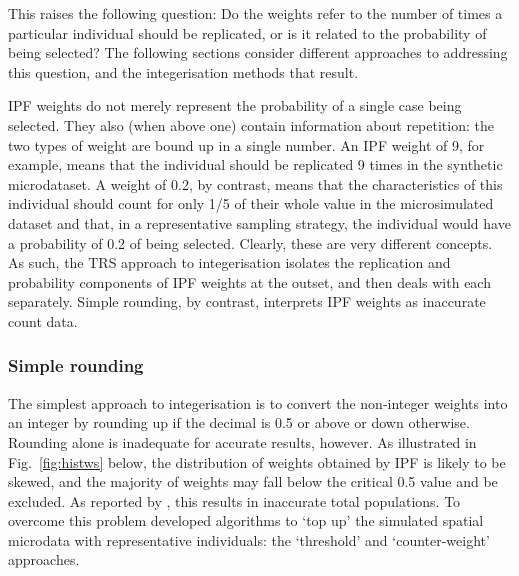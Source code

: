 This raises the following question: Do the weights refer to the number of times
a particular individual should be replicated, or is it related to the
probability of being selected? The following sections
consider different approaches to addressing this question, and the
integerisation methods that result.


IPF weights do not merely represent the probability of a single case
being selected. They also (when above one) contain information about
repetition: the two types of weight are bound up in a single number. An
IPF weight of 9, for example, means that the individual should be replicated
9 times in the synthetic microdataset. A weight of 0.2, by contrast, means
that the characteristics of this individual should count for only 1/5 of their
whole value in the microsimulated dataset and that, in a representative
sampling strategy, the individual would have a probability of 0.2 of being
selected. Clearly, these are very different concepts. As such, the TRS approach
to integerisation isolates
the replication and probability components of IPF weights at the outset, and
then deals with each separately. Simple rounding, by contrast, interprets IPF
weights as inaccurate count data.


\subsubsection{Simple rounding}
The simplest approach to integerisation is to convert the non-integer
weights into an integer by rounding up if 
the decimal is 0.5 or above or down otherwise.
Rounding alone is inadequate for accurate results, however. As illustrated in
Fig.~\ref{fig:histws} below, the distribution of weights obtained by IPF is
likely to be skewed, and the majority of weights may fall below the critical 0.5
value and be excluded. As reported by \citet[25]{Ballas2005c}, this results in
inaccurate total populations. To overcome this problem
\citet{Ballas2005c} developed algorithms to `top up' the simulated
spatial microdata with
representative individuals: the `threshold' and `counter-weight' approaches.

